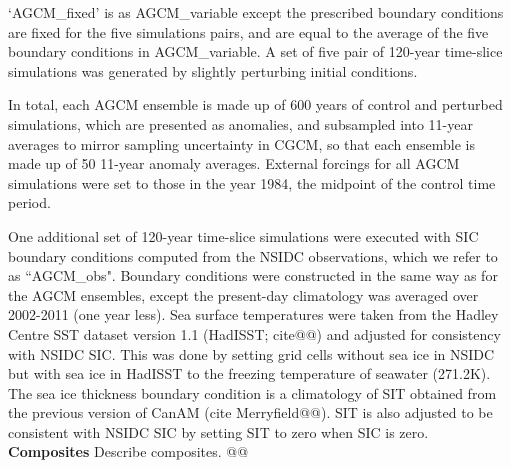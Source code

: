 \documentclass{nature}
\begin{document}
\begin{methods}
`AGCM\_fixed' is as AGCM\_variable except the prescribed boundary conditions are fixed for the five simulations pairs, and are equal to the average of the five boundary conditions in AGCM\_variable. A set of five pair of 120-year time-slice simulations was generated by slightly perturbing initial conditions. 

In total, each AGCM ensemble is made up of 600 years of control and perturbed simulations, which are presented as anomalies, and subsampled into 11-year averages to mirror sampling uncertainty in CGCM, so that each ensemble is made up of 50 11-year anomaly averages. External forcings for all AGCM simulations were set to those in the year 1984, the midpoint of the control time period.  %

One additional set of 120-year time-slice simulations were executed with SIC boundary conditions computed from the NSIDC observations, which we refer to as ``AGCM\_obs". Boundary conditions were constructed in the same way as for the AGCM ensembles, except the present-day climatology was averaged over 2002-2011 (one year less). Sea surface temperatures were taken from the Hadley Centre SST dataset version 1.1 (HadISST; cite@@) and adjusted for consistency with NSIDC SIC. This was done by setting grid cells without sea ice in NSIDC but with sea ice in HadISST to the freezing temperature of seawater (271.2K). The sea ice thickness boundary condition is a climatology of SIT obtained from the previous version of CanAM (cite Merryfield@@). SIT is also adjusted to be consistent with NSIDC SIC by setting SIT to zero when SIC is zero.
\\
\textbf{Composites}
Describe composites. @@

\end{methods}
\end{document}
